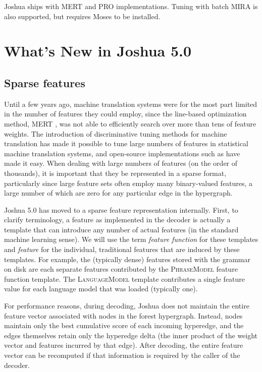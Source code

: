 \documentclass[11pt]{article}
\begin{document}
Joshua ships with MERT \cite{Och2003} and PRO implementations.  Tuning
with batch MIRA \cite{cherry2012batch} is also supported, but requires
Moses to be installed.


\section{What's New in Joshua 5.0}

\subsection{Sparse features}
\label{sec:sparse}

Until a few years ago, machine translation systems were for the most
part limited in the number of features they could employ, since the
line-based optimization method, MERT \cite{Och2003}, was not able to
efficiently search over more than tens of feature weights.  The
introduction of discriminative tuning methods for machine translation
\cite{liang2006end,tillmann-zhang:2006:COLACL,chiang2008online,PRO2011}
has made it possible to tune large numbers of features in statistical
machine translation systems, and open-source implementations such as
 have made it easy.  When dealing with large
numbers of features (on the order of thousands), it is important that
they be represented in a sparse format, particularly since large
feature sets often employ many binary-valued features, a large number
of which are zero for any particular edge in the hypergraph.

Joshua 5.0 has moved to a sparse feature representation
internally. First, to clarify terminology, a feature as implemented in
the decoder is actually a template that can introduce any number of
actual features (in the standard machine learning sense). We will use
the term \emph{feature function} for these templates and
\emph{feature} for the individual, traditional features that are
induced by these templates. For example, the (typically dense)
features stored with the grammar on disk are each separate features
contributed by the \textsc{PhraseModel} feature function template. The
\textsc{LanguageModel} template contributes a single feature value for
each language model that was loaded (typically one).

For performance reasons, during decoding, Joshua does not maintain the
entire feature vector associated with nodes in the forest hypergraph.
Instead, nodes maintain only the best cumulative score of each
incoming hyperedge, and the edges themselves retain only the hyperedge
delta (the inner product of the weight vector and features incurred by
that edge).  After decoding, the entire feature vector can be
recomputed if that information is required by the caller of the
decoder.  
\end{document}
